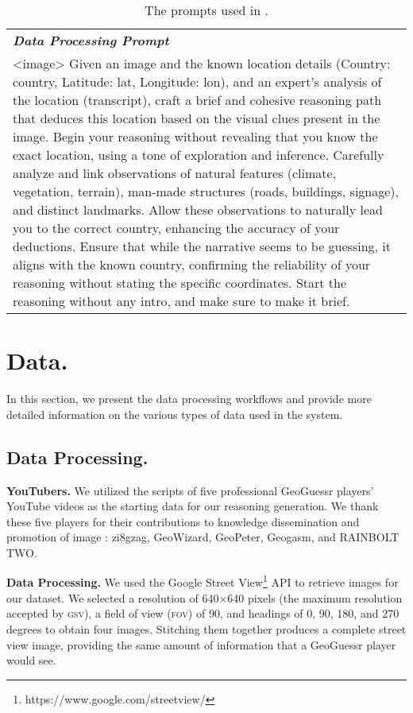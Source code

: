 \begin{table}[htbp]
    \centering
    \small
    \begin{tabularx}{\linewidth}{Y}
    \toprule 
        \textit{\textbf{Data Processing Prompt}} \\
        <image> Given an image and the known location details (Country: {country}, Latitude: {lat}, Longitude: {lon}), and an expert's analysis of the location ({transcript}), craft a brief and cohesive reasoning path that deduces this location based on the visual clues present in the image. Begin your reasoning without revealing that you know the exact location, using a tone of exploration and inference. Carefully analyze and link observations of natural features (climate, vegetation, terrain), man-made structures (roads, buildings, signage), and distinct landmarks. Allow these observations to naturally lead you to the correct country, enhancing the accuracy of your deductions. Ensure that while the narrative seems to be guessing, it aligns with the known country, confirming the reliability of your reasoning without stating the specific coordinates. Start the reasoning without any intro, and make sure to make it brief. \\
    \bottomrule
    \end{tabularx}
    \caption{The prompts used in \modelname.}
    \label{tab:data_prompts}
\end{table}


\section{Data.}
\label{apd:data}

In this section, we present the data processing workflows and provide more detailed information on the various types of data used in the system.

\subsection{Data Processing.}

\textbf{YouTubers.} We utilized the scripts of five professional GeoGuessr players' YouTube videos as the starting data for our reasoning generation. We thank these five players for their contributions to knowledge dissemination and promotion of image \geoloc: zi8gzag, GeoWizard, GeoPeter, Geogasm, and RAINBOLT TWO.

\textbf{Data Processing.}
We used the Google Street View\footnote{https://www.google.com/streetview/} API to retrieve images for our dataset. We selected a resolution of 640×640 pixels (the maximum resolution accepted by \textsc{gsv}), a field of view (\textsc{fov}) of 90, and headings of 0, 90, 180, and 270 degrees to obtain four images. Stitching them together produces a complete street view image, providing the same amount of information that a GeoGuessr player would see.

